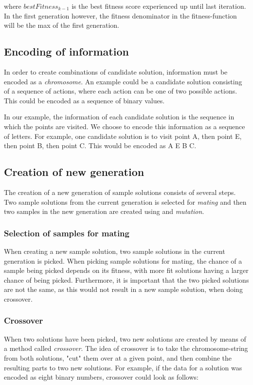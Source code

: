 where $bestFitness_{k-1}$ is the best fitness score experienced up until last iteration. In the first generation however, the fitness denominator in the fitness-function will be the max of the first generation.

\subsection{Encoding of information}
In order to create combinations of candidate solution, information must be encoded as a \textit{chromosome}. An example could be a candidate solution consisting of a sequence of actions, where each action can be one of two possible actions. This could be encoded as a sequence of binary values.

In our example, the information of each candidate solution is the sequence in which the points are visited. We choose to encode this information as a sequence of letters. For example, one candidate solution is to visit point A, then point E, then point B, then point C. This would be encoded as
A E B C.

\subsection{Creation of new generation}
The creation of a new generation of sample solutions consists of several steps. Two sample solutions from the current generation is selected for \textit{mating} and then two samples in the new generation are created using  and \textit{mutation}.

\subsubsection{Selection of samples for mating}
When creating a new sample solution, two sample solutions in the current generation is picked. When picking sample solutions for mating, the chance of a sample being picked depends on its fitness, with more fit solutions having a larger chance of being picked. Furthermore, it is important that the two picked solutions are not the same, as this would not result in a new sample solution, when doing crossover.

\subsubsection{Crossover}
When two solutions have been picked, two new solutions are created by means of a method called \textit{crossover}. The idea of crossover is to take the chromosome-string from both solutions, "cut" them over at a given point, and then combine the resulting parts to two new solutions. For example, if the data for a solution was encoded as eight binary numbers, crossover could look as follows:

